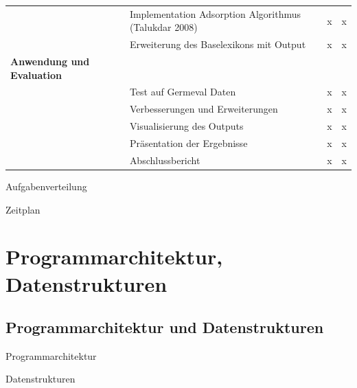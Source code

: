 \documentclass{beamer}
\begin{document}
\begin{frame}[plain, t]
\begin{table}[]
{\begin{tabular}{llll}
 & Implementation Adsorption Algorithmus (Talukdar 2008) & x & x \\
 & Erweiterung des Baselexikons mit Output & x & x \\
\bf{Anwendung und Evaluation} &  &  &  \\
 & Test auf Germeval Daten & x & x \\
 & Verbesserungen und Erweiterungen & x & x \\
 & Visualisierung des Outputs & x & x \\
 & Präsentation der Ergebnisse & x & x \\
 & Abschlussbericht & x & x
\end{tabular}%
}
\end{table}
\end{frame}

\begin{frame}{Aufgabenverteilung}
\end{frame}

\begin{frame}{Zeitplan}
\end{frame}

\section{Programmarchitektur, Datenstrukturen}
\subsection[Programmarchitektur]{ Programmarchitektur und Datenstrukturen }

\begin{frame}{Programmarchitektur}
\end{frame}

\begin{frame}{Datenstrukturen}
\end{frame}

\section{}
\subsection[]{}


\end{document}
